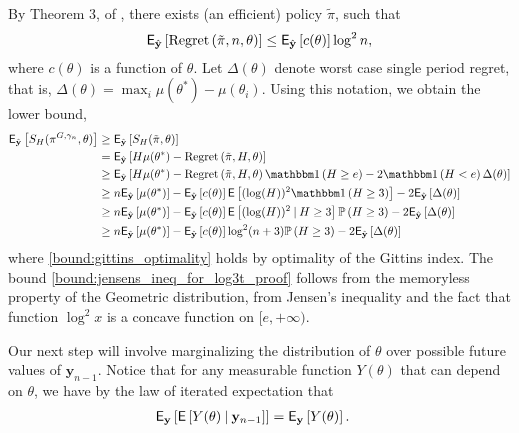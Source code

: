 \begin{myproof}[Proof.]
	By Theorem 3, of \cite{lai1987adaptive}, there exists (an efficient) policy $\tilde \pi$, such that 
	\[
	\mathsf{E}_{\hat{\mathbf y}}\left[\textnormal{Regret} \left( \tilde \pi, n, \theta \right) \right] \le \mathsf{E}_{\hat{\mathbf y}}\left[c(\theta)\right] \log^2 n,
	\] 
	where $c(\theta)$ is a function of $\theta$.
	Let $\Delta(\theta)$ denote worst case  single period regret, that is, $\Delta(\theta) =  \max_{i} \mu(\theta^*) - \mu(\theta_i)$. Using this notation, we obtain the lower bound,
	\begin{align}
	\E_{\hat{\mathbf y}}\left[S_H(\pi^{G, \gamma_n}, \theta)\right] & \ge \E_{\hat{\mathbf y}}\left[S_H(\tilde \pi, \theta)\right]  \label{bound:gittins_optimality} \\
	&  =  \E_{\hat{\mathbf y}}\left[H\mu(\theta^*) - \Regret{\tilde \pi, H, \theta}\right] \nonumber \\
	& \ge  \E_{\hat{\mathbf y}}\left[H\mu(\theta^*) -\Regret{\tilde \pi, H, \theta}\ind{H \ge e} - 2\ind{H < e}\Delta(\theta)\right] \nonumber \\
	& \ge n \E_{\hat{\mathbf y}}\left[\mu(\theta^*)\right] - \E_{\hat{\mathbf y}}\left[c(\theta)\right] \Ee{(\log (H))^2 \ind{H \ge 3} } - 2\E_{\hat{\mathbf y}}\left[\Delta(\theta)\right] \nonumber \\
	& \ge n  \E_{\hat{\mathbf y}}\left[\mu(\theta^*)\right] - \E_{\hat{\mathbf y}}\left[c(\theta)\right] \Ee{(\log (H))^2 \given H \ge 3}\P{H \ge 3} - 2\E_{\hat{\mathbf y}}\left[\Delta(\theta)\right] \nonumber \\
	& \ge n  \E_{\hat{\mathbf y}}\left[\mu(\theta^*)\right] - \E_{\hat{\mathbf y}}\left[c(\theta)\right] \log^2 (n+3)\P{H \ge 3} - 2\E_{\hat{\mathbf y}}\left[\Delta(\theta)\right]\label{bound:jensens_ineq_for_log3t_proof}
	\end{align}
	where \eqref{bound:gittins_optimality} holds by optimality of the Gittins index. The bound \eqref{bound:jensens_ineq_for_log3t_proof} follows from the memoryless property of the Geometric distribution, from Jensen's inequality and the fact that function $\log^2 x$ is a concave function on $[e,+\infty)$. 
	
	Our next step will involve marginalizing the distribution of $\theta$ over possible future values of $\mathbf y_{n-1}$. Notice that for any measurable function $Y(\theta)$ that can depend on $\theta$,  we have by the law of iterated expectation that
	\begin{align}
		& \mathsf{E}_{\mathbf y}\left[\mathsf{E} \left[  Y(\theta) \:\vert\: \mathbf{y}_{n-1} \right]\right]  = \mathsf{E}_{\mathbf y}\left[Y(\theta)\right]. \label{eqn:tower_prop_for_ytheta}
	\end{align}
	

\end{myproof}
